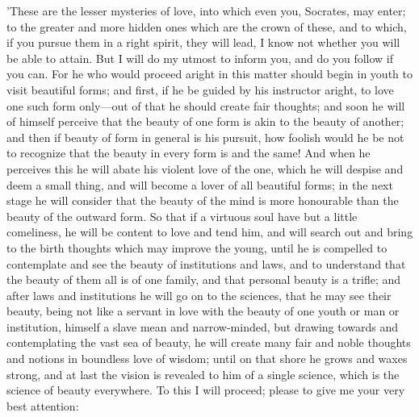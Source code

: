 \documentclass[11pt,letter]{article}
\begin{document}
\par  'These are the lesser mysteries of love, into which even you, Socrates, may enter; to the greater and more hidden ones which are the crown of these, and to which, if you pursue them in a right spirit, they will lead, I know not whether you will be able to attain. But I will do my utmost to inform you, and do you follow if you can. For he who would proceed aright in this matter should begin in youth to visit beautiful forms; and first, if he be guided by his instructor aright, to love one such form only—out of that he should create fair thoughts; and soon he will of himself perceive that the beauty of one form is akin to the beauty of another; and then if beauty of form in general is his pursuit, how foolish would he be not to recognize that the beauty in every form is and the same! And when he perceives this he will abate his violent love of the one, which he will despise and deem a small thing, and will become a lover of all beautiful forms; in the next stage he will consider that the beauty of the mind is more honourable than the beauty of the outward form. So that if a virtuous soul have but a little comeliness, he will be content to love and tend him, and will search out and bring to the birth thoughts which may improve the young, until he is compelled to contemplate and see the beauty of institutions and laws, and to understand that the beauty of them all is of one family, and that personal beauty is a trifle; and after laws and institutions he will go on to the sciences, that he may see their beauty, being not like a servant in love with the beauty of one youth or man or institution, himself a slave mean and narrow-minded, but drawing towards and contemplating the vast sea of beauty, he will create many fair and noble thoughts and notions in boundless love of wisdom; until on that shore he grows and waxes strong, and at last the vision is revealed to him of a single science, which is the science of beauty everywhere. To this I will proceed; please to give me your very best attention:
\end{document}
